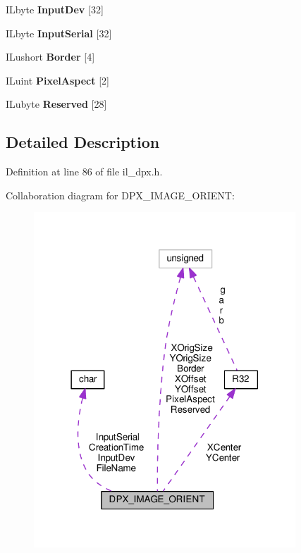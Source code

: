 \begin{DoxyCompactItemize}
\mbox{\label{structDPX__IMAGE__ORIENT_a3fbb49263620668a842e2a5ed082cb64}} 
I\+Lbyte {\bfseries Input\+Dev} \mbox{[}32\mbox{]}
\item 
\mbox{\label{structDPX__IMAGE__ORIENT_a028ee5314b84a26624144134429f420b}} 
I\+Lbyte {\bfseries Input\+Serial} \mbox{[}32\mbox{]}
\item 
\mbox{\label{structDPX__IMAGE__ORIENT_a68c4ee2855821f2e408feb1c82b82305}} 
I\+Lushort {\bfseries Border} \mbox{[}4\mbox{]}
\item 
\mbox{\label{structDPX__IMAGE__ORIENT_a4d98a9abd204a141a4191d6bf3c0a8e9}} 
I\+Luint {\bfseries Pixel\+Aspect} \mbox{[}2\mbox{]}
\item 
\mbox{\label{structDPX__IMAGE__ORIENT_a8acd226b725115760ddabdd660337b07}} 
I\+Lubyte {\bfseries Reserved} \mbox{[}28\mbox{]}
\end{DoxyCompactItemize}


\subsection{Detailed Description}


Definition at line 86 of file il\+\_\+dpx.\+h.



Collaboration diagram for D\+P\+X\+\_\+\+I\+M\+A\+G\+E\+\_\+\+O\+R\+I\+E\+NT\+:
\nopagebreak
\begin{figure}[H]
\begin{center}
\leavevmode
\includegraphics[width=278pt]{d1/d37/structDPX__IMAGE__ORIENT__coll__graph}
\end{center}
\end{figure}


